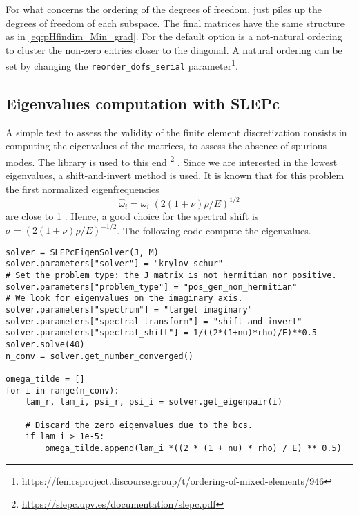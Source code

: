 For what concerns the ordering of the degrees of freedom, \firedrake just piles up the degrees of freedom of each subspace. The final matrices have the same structure as in \eqref{eq:pHfindim_Min_grad}. For \fenics the default option is a not-natural ordering to cluster the non-zero entries closer to the diagonal. A natural ordering can be set by changing the \verb|reorder_dofs_serial| parameter\footnote{\url{https://fenicsproject.discourse.group/t/ordering-of-mixed-elements/946}}.

\subsection*{Eigenvalues computation with SLEPc}
A simple test to assess the validity of the finite element discretization consists in computing the eigenvalues of the matrices, to assess the absence of spurious modes. The {} library is used to this end \footnote{\url{https://slepc.upv.es/documentation/slepc.pdf}} \cite{hernandez2005slepc}. Since we are interested in the lowest eigenvalues, a shift-and-invert method is used. It is known that for this problem the first normalized eigenfrequencies
\[
\widehat{\omega}_i = \omega_i \; (2(1+\nu)\rho/E)^{1/2}
\]
are close to 1 \cite{dawe1980rayleigh}. Hence, a good choice for the spectral shift is $\sigma = (2(1+\nu)\rho/E)^{-1/2}$.  The following code compute the eigenvalues.
\begin{tcolorbox}[title = Eigenvalues computation in  \fenics, coltitle=black, breakable, size=fbox, boxrule=1pt, pad at break*=1mm, colframe=red, enlarge top by=0.25em, enlarge bottom by=0.5em]
\begin{Verbatim}[tabsize=4]
solver = SLEPcEigenSolver(J, M)
solver.parameters["solver"] = "krylov-schur"
# Set the problem type: the J matrix is not hermitian nor positive.
solver.parameters["problem_type"] = "pos_gen_non_hermitian"
# We look for eigenvalues on the imaginary axis.
solver.parameters["spectrum"] = "target imaginary"
solver.parameters["spectral_transform"] = "shift-and-invert"
solver.parameters["spectral_shift"] = 1/((2*(1+nu)*rho)/E)**0.5
solver.solve(40)
n_conv = solver.get_number_converged()

omega_tilde = []
for i in range(n_conv):
	lam_r, lam_i, psi_r, psi_i = solver.get_eigenpair(i)
	
	# Discard the zero eigenvalues due to the bcs.
	if lam_i > 1e-5:
		omega_tilde.append(lam_i *((2 * (1 + nu) * rho) / E) ** 0.5)
\end{Verbatim}
\end{tcolorbox}

